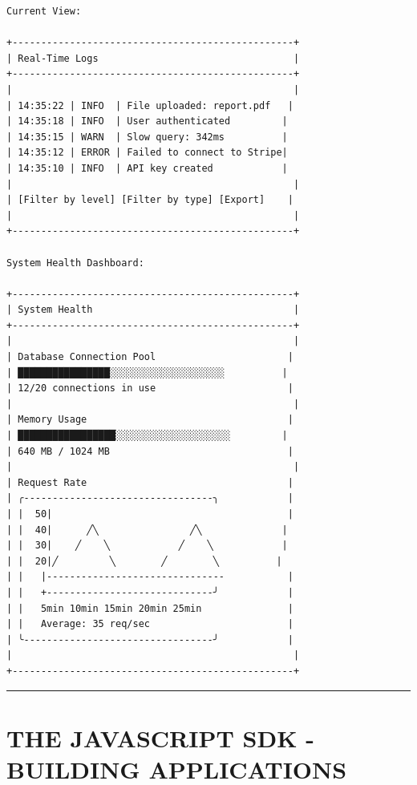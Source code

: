 \documentclass[11pt,a4paper]{report}
\begin{document}
\begin{lstlisting}[language=text]
Current View:

+-------------------------------------------------+
| Real-Time Logs                                  |
+-------------------------------------------------+
|                                                 |
| 14:35:22 | INFO  | File uploaded: report.pdf   |
| 14:35:18 | INFO  | User authenticated         |
| 14:35:15 | WARN  | Slow query: 342ms          |
| 14:35:12 | ERROR | Failed to connect to Stripe|
| 14:35:10 | INFO  | API key created            |
|                                                 |
| [Filter by level] [Filter by type] [Export]    |
|                                                 |
+-------------------------------------------------+

System Health Dashboard:

+-------------------------------------------------+
| System Health                                   |
+-------------------------------------------------+
|                                                 |
| Database Connection Pool                       |
| ████████████████░░░░░░░░░░░░░░░░░░░░          |
| 12/20 connections in use                       |
|                                                 |
| Memory Usage                                   |
| █████████████████░░░░░░░░░░░░░░░░░░░░         |
| 640 MB / 1024 MB                               |
|                                                 |
| Request Rate                                   |
| ╭---------------------------------╮            |
| |  50|                                         |
| |  40|      ╱╲                ╱╲              |
| |  30|    ╱    ╲            ╱    ╲            |
| |  20|╱         ╲        ╱        ╲          |
| |   |-------------------------------           |
| |   +-----------------------------╯            |
| |   5min 10min 15min 20min 25min               |
| |   Average: 35 req/sec                        |
| ╰---------------------------------╯            |
|                                                 |
+-------------------------------------------------+
\end{lstlisting}


\vfill\hrule\vfill



\part{THE JAVASCRIPT SDK - BUILDING APPLICATIONS}
\end{document}
